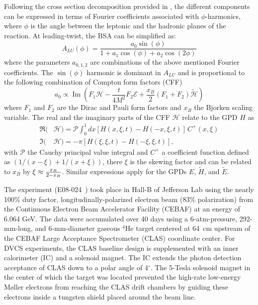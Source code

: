 \documentclass[twocolumn,nofootinbib,showpacs,prl,superscriptaddress,secnumarabic,amssymb,nobibnotes,aps,floatfix]{revtex4}
\begin{document}
Following the cross section decomposition provided in \cite{Belitsky:2001ns}, 
the different components can be expressed in terms of Fourier coefficients 
associated with $\phi$-harmonics, where $\phi$ is the angle between the 
leptonic and the hadronic planes of the reaction. At leading-twist, the 
BSA can be simplified as: 
\begin{equation}
   A_{LU}(\phi) = \frac{a_{0}\sin(\phi)}{1+a_{1}\cos(\phi)+a_{2}\cos(2\phi)}
   \label{eq:alu-simp}
\end{equation}
where the parameters $a_{0,1,2}$ are combinations of the above mentioned Fourier 
coefficients. The $\sin(\phi)$ harmonic is dominant in $A_{LU}$ 
and is proportional to the following combination of Compton form factors (CFF) 
\cite{Guidal:2013rya}
\begin{equation}
   a_{0} \propto \operatorname{Im}( F_1 \mathcal{H}- \frac{t}{4M^2} F_2 
   \mathcal{E}+ \frac{x_B}{2}(F_1+F_2)\tilde{\mathcal{H}})
\end{equation}
where $F_1$ and $F_2$ are the Dirac and Pauli form factors and $x_B$ the 
Bjorken scaling variable. The real and the imaginary parts of the CFF 
$\mathcal{H}$ relate to the GPD $H$ as  
\begin{align}
   \Re(&\mathcal{H}) = \mathcal{P} \int_{0}^{1}dx[H(x,\xi,t)-H(-x,\xi,t)] \, 
   C^{+}(x,\xi) \\
   \Im(&\mathcal{H}) = - \pi [H(\xi,\xi,t)-H(-\xi,\xi,t)],
\end{align}
with $\mathcal{P}$ the Cauchy principal value integral and $C^{+}$ a 
coefficient function defined as $(1/(x-\xi) + 1/(x+\xi))$, there $\xi$ is the 
skewing factor and can be
related to $x_B$ by $\xi\approx {{x_B}\over{2-x_B}}$. Similar expressions apply 
for the GPDs $E$, $\widetilde{H}$, and $\widetilde{E}$.


The experiment (E08-024~\cite{Hafidi:2008pr}) took place in Hall-B of Jefferson 
Lab using the nearly 100\% duty factor, longitudinally-polarized electron beam 
(83$\%$ polarization) from the Continuous Electron Beam Accelerator Facility 
(CEBAF) at an energy of 6.064 GeV. The data were accumulated over 
40 days using a 6-atm-pressure, 292-mm-long, and 6-mm-diameter gaseous $^4$He 
target centered at 64~cm upstream of the CEBAF Large Acceptance Spectrometer 
(CLAS) coordinate center. For DVCS experiments, the CLAS baseline design 
\cite{Mecking:2003zu} is supplemented with an inner calorimeter (IC) and a 
solenoid magnet. The IC extends the photon detection acceptance of CLAS down 
to a polar angle of 4$^{\circ}$. The 5-Tesla solenoid magnet in the center of 
which the target was located prevented the high-rate low-energy M{\o}ller 
electrons from reaching the CLAS drift chambers by guiding these electrons 
inside a tungsten shield placed around the beam line. 
\end{document}
